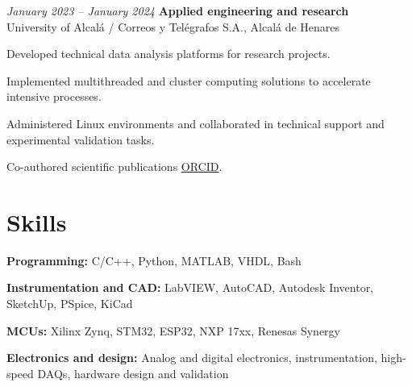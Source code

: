 \begin{twocolentry}{\textit{January 2023 – January 2024}}
	\textbf{Applied engineering and research} \\
	University of Alcalá / Correos y Telégrafos S.A., Alcalá de Henares
\end{twocolentry}
\begin{onecolentry}
	\begin{highlights}
		\item Developed technical data analysis platforms for research projects.
		\item Implemented multithreaded and cluster computing solutions to accelerate intensive processes.
		\item Administered Linux environments and collaborated in technical support and experimental validation tasks.
		\item Co-authored scientific publications \href{https://orcid.org/0009-0000-6862-1872}{ORCID}.
	\end{highlights}
\end{onecolentry}

\vspace{-7pt}

\section{Skills}

\begin{onecolentry}
	\textbf{Programming:} C/C++, Python, MATLAB, VHDL, Bash
\end{onecolentry}
\begin{onecolentry}
	\textbf{Instrumentation and CAD:} LabVIEW, AutoCAD, Autodesk Inventor, SketchUp, PSpice, KiCad
\end{onecolentry}
\begin{onecolentry}
	\textbf{MCUs:} Xilinx Zynq, STM32, ESP32, NXP 17xx, Renesas Synergy
\end{onecolentry}
\begin{onecolentry}
	\textbf{Electronics and design:} Analog and digital electronics, instrumentation, high-speed DAQs, hardware design and validation
\end{onecolentry}
